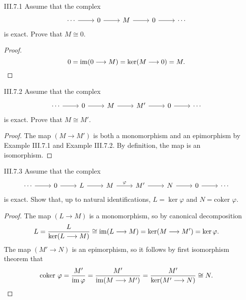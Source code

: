 \begin{problem}{III.7.1}
Assume that the complex
\[
\begin{tikzcd}
\cdots \arrow[r] &0 \arrow[r] &M \arrow[r] &0 \arrow[r] &\cdots 
\end{tikzcd}
\]
is exact. Prove that $M \cong 0$.
\end{problem}
\begin{proof}
\[
0 = \operatorname{im} (0 \longrightarrow M) = \ker (M \longrightarrow 0) = M.
\]
\end{proof}

\begin{problem}{III.7.2}
Assume that the complex
\[
\begin{tikzcd}
\cdots \arrow[r] &0 \arrow[r] &M \arrow[r] &M' \arrow[r] &0 \arrow[r] &\cdots 
\end{tikzcd}
\]
is exact. Prove that $M \cong M'$.
\end{problem}
\begin{proof}
The map $(M \longrightarrow M')$ is both a monomorphism and an epimorphism by Example III.7.1 and Example III.7.2. By definition, the map is an isomorphism. 
\end{proof}

\begin{problem}{III.7.3}
Assume that the complex
\[
\begin{tikzcd}
\cdots \arrow[r] & 0 \arrow[r] & L \arrow[r] & M \arrow[r, "\varphi"] & M' \arrow[r] & N \arrow[r] & 0 \arrow[r] & \cdots
\end{tikzcd}	
\]
is exact. Show that, up to natural identifications, $L = \ker \varphi$ and $N = \text{coker }\varphi$.
\end{problem}
\begin{proof}
The map $(L \longrightarrow M)$ is a monomorphism, so by canonical decomposition 
\[
L = \frac{L}{\ker (L \longrightarrow M)} \cong \operatorname{im}(L \longrightarrow M) = \ker (M \longrightarrow M') = \ker \varphi.
\]
The map $(M' \longrightarrow N)$ is an epimorphism, so it follows by first isomorphism theorem that
\[
\text{coker }\varphi=\frac{M'}{\operatorname{im} \varphi}=\frac{M'}{\operatorname{im}(M \longrightarrow M')}= \frac{M'}{\ker(M' \longrightarrow N)} \cong N.
\]
\end{proof}

